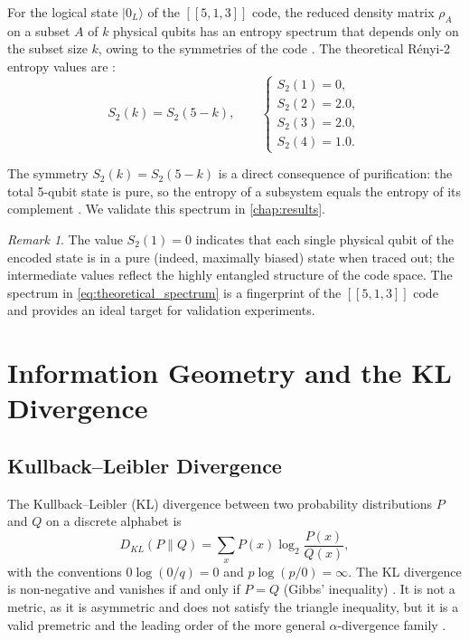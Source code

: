 \documentclass[12pt,a4paper,oneside]{book}
\theoremstyle{plain}
\theoremstyle{definition}
\theoremstyle{remark}
\newtheorem{remark}[theorem]{Remark}
\begin{document}
For the logical state $|0_L\rangle$ of the $[[5,1,3]]$ code, the reduced density matrix $\rho_A$ on a subset $A$ of $k$ physical qubits has an entropy spectrum that depends only on the subset size $k$, owing to the symmetries of the code \cite{laflamme1996perfect}. The theoretical R\'enyi-2 entropy values are \cite{obremski2017renyi, laflamme1996perfect}:
\begin{equation}
    \label{eq:theoretical_spectrum}
    S_2(k) = S_2(5-k), \qquad
    \begin{cases}
        S_2(1) = 0, \\
        S_2(2) = 2.0, \\
        S_2(3) = 2.0, \\
        S_2(4) = 1.0.
    \end{cases}
\end{equation}

The symmetry $S_2(k) = S_2(5-k)$ is a direct consequence of purification: the total 5-qubit state is pure, so the entropy of a subsystem equals the entropy of its complement \cite{horodecki2009quantum}. We validate this spectrum in \cref{chap:results}.

\begin{remark}
The value $S_2(1) = 0$ indicates that each single physical qubit of the encoded state is in a pure (indeed, maximally biased) state when traced out; the intermediate values reflect the highly entangled structure of the code space. The spectrum in \cref{eq:theoretical_spectrum} is a fingerprint of the $[[5,1,3]]$ code and provides an ideal target for validation experiments.
\end{remark}

\section{Information Geometry and the KL Divergence}
\label{sec:info_geometry}

\subsection{Kullback--Leibler Divergence}

The Kullback--Leibler (KL) divergence \cite{kullback1951information} between two probability distributions $P$ and $Q$ on a discrete alphabet is
\begin{equation}
    \label{eq:kl_divergence}
    D_{KL}(P \| Q) = \sum_x P(x) \log_2 \frac{P(x)}{Q(x)},
\end{equation}
with the conventions $0 \log(0/q) = 0$ and $p \log(p/0) = \infty$. The KL divergence is non-negative and vanishes if and only if $P = Q$ (Gibbs' inequality) \cite{cover2006elements}. It is not a metric, as it is asymmetric and does not satisfy the triangle inequality, but it is a valid premetric and the leading order of the more general $\alpha$-divergence family \cite{amari2007methods}.
\end{document}
